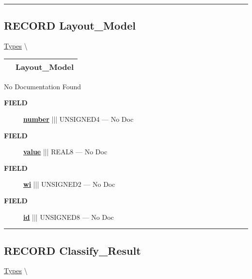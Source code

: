 \rule{\linewidth}{0.5pt}
\subsection*{\textsf{\colorbox{headtoc}{\color{white} RECORD}
Layout\_Model}}

\hypertarget{ecldoc:ml_core.types.layout_model}{}
\hspace{0pt} \hyperlink{ecldoc:ML_Core.Types}{Types} \textbackslash 

{\renewcommand{\arraystretch}{1.5}
\begin{tabularx}{\textwidth}{|>{\raggedright\arraybackslash}l|X|}
\hline
\hspace{0pt}\mytexttt{\color{red} } & \textbf{Layout\_Model} \\
\hline
\end{tabularx}
}

\par





No Documentation Found







\par
\begin{description}
\item [\colorbox{tagtype}{\color{white} \textbf{\textsf{FIELD}}}] \textbf{\underline{number}} ||| UNSIGNED4 --- No Doc
\item [\colorbox{tagtype}{\color{white} \textbf{\textsf{FIELD}}}] \textbf{\underline{value}} ||| REAL8 --- No Doc
\item [\colorbox{tagtype}{\color{white} \textbf{\textsf{FIELD}}}] \textbf{\underline{wi}} ||| UNSIGNED2 --- No Doc
\item [\colorbox{tagtype}{\color{white} \textbf{\textsf{FIELD}}}] \textbf{\underline{id}} ||| UNSIGNED8 --- No Doc
\end{description}





\rule{\linewidth}{0.5pt}
\subsection*{\textsf{\colorbox{headtoc}{\color{white} RECORD}
Classify\_Result}}

\hypertarget{ecldoc:ml_core.types.classify_result}{}
\hspace{0pt} \hyperlink{ecldoc:ML_Core.Types}{Types} \textbackslash 

